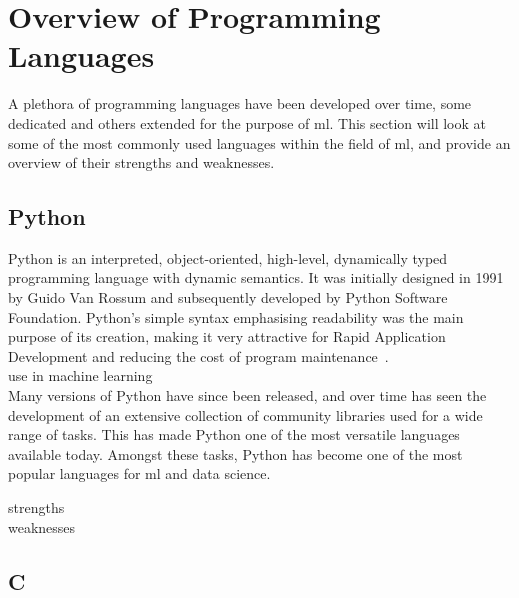 
\section{Overview of Programming Languages}

A plethora of programming languages have been developed over time, some dedicated and others extended for the purpose of \gls{ml}.
This section will look at some of the most 
commonly used languages within the field of \gls{ml}, and provide an overview of their strengths and weaknesses.

\subsection{Python}

Python is an interpreted, object-oriented, high-level, dynamically typed programming language with dynamic semantics. It was initially designed in 1991 by Guido Van Rossum and subsequently
developed by Python Software Foundation. Python's simple syntax emphasising readability was the main purpose of its creation, making it very attractive for Rapid Application Development and reducing
the cost of program maintenance~\citep{whatispython}.\\

use in machine learning\\

Many versions of Python have since been released, and over time has seen the development of an extensive collection of community libraries used for a wide range of tasks. This
has made Python one of the most versatile languages available today. Amongst these tasks, Python has become one of the most popular languages for \gls{ml} and data science.


strengths\\

weaknesses\\


\subsection{C}

